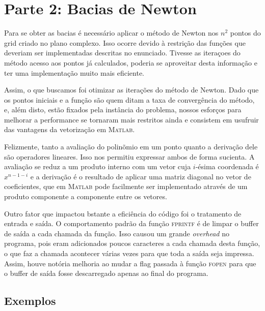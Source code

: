 \documentclass{article}
\begin{document}
\section{Parte 2: Bacias de Newton}
Para se obter as bacias é necessário aplicar o método de Newton nos $n^2$ pontos do grid criado no plano complexo. Isso ocorre devido à restrição das funções que deveriam ser implementadas descritas no enunciado. Tivesse as iteraçoes do método acesso aos pontos já calculados, poderia se aproveitar desta informação e ter uma implementação muito mais eficiente.  

Assim, o que buscamos foi otimizar as iterações do método de Newton. Dado que os pontos iniciais e a função são quem ditam a taxa de convergência do método, e, além disto, estão fixados pela instância do problema, nossos esforços para melhorar a performance se tornaram mais restritos ainda e consistem em usufruir das vantagens da vetorização em \textsc{Matlab}.  

Felizmente, tanto a avaliação do polinõmio em um ponto quanto a derivação dele são operadores lineares. Isso nos permitiu expressar ambos de forma sucienta. A avaliação se reduz a um produto interno com um vetor cuja $i$-ésima coordenada é $x^{n-1-i}$ e a derivação é o resultado de aplicar uma matriz diagonal no vetor de coeficientes, que em \textsc{Matlab} pode facilmente ser implementado através de um produto componente a componente entre os vetores.

Outro fator que impactou bstante a eficiência do código foi o tratamento de entrada e saída. O comportamento padrão da função \textsc{fprintf} é de limpar o buffer de saída a cada chamada da função. Isso causou um grande \textit{overhead} no programa, pois eram adicionados poucos caracteres a cada chamada desta função, o que faz a chamada acontecer várias vezes para que toda a saída seja impressa. Assim, houve notória melhoria ao mudar a flag passada à função \textsc{fopen} para que o buffer de saída fosse descarregado apenas ao final do programa.

\subsection{Exemplos}
\end{document}
